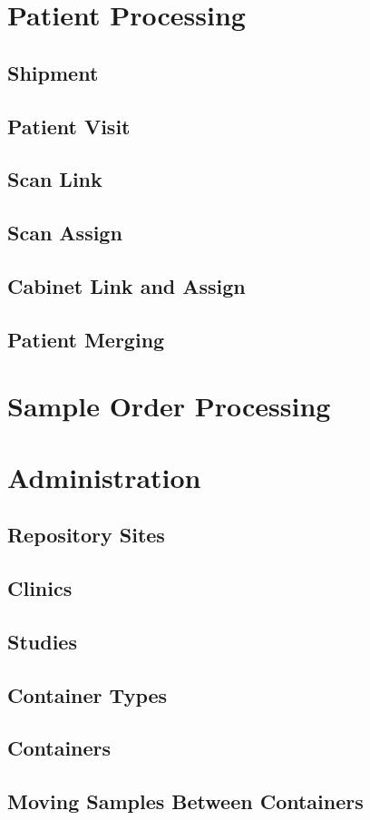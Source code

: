 \chapter{Patient Processing}
\section{Shipment}
\section{Patient Visit}
\section{Scan Link}
\section{Scan Assign}
\section{Cabinet Link and Assign}
\section{Patient Merging}
\chapter{Sample Order Processing}
\chapter{Administration}
\section{Repository Sites}
\section{Clinics}
\section{Studies}
\section{Container Types}
\section{Containers}
\section{Moving Samples Between Containers}
